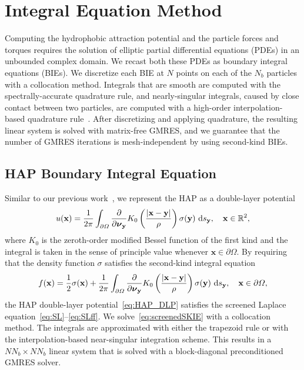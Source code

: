 \documentclass[lineno]{jfm}
\newcommand{\bd}{\partial}
\newcommand{\nnu}{\boldsymbol{\nu}}
\newcommand{\xx}{\mathbf{x}}
\newcommand{\yy}{\mathbf{y}}
\newcommand{\pderiv}[2]{\frac{\partial #1}{\partial #2}}
\begin{document}
\section{Integral Equation Method}
\label{sec:IEM}
Computing the hydrophobic attraction potential and the particle forces
and torques requires the solution of elliptic partial differential
equations (PDEs) in an unbounded complex domain. We recast both these
PDEs as boundary integral equations (BIEs). We discretize each BIE at
$N$ points on each of the $N_b$ particles with a collocation method.
Integrals that are smooth are computed with the spectrally-accurate
quadrature rule, and nearly-singular integrals, caused by close contact
between two particles, are computed with a high-order
interpolation-based quadrature rule~\cite{qua-bir2014}. After
discretizing and applying quadrature, the resulting linear system is
solved with matrix-free GMRES, and we guarantee that the number of GMRES
iterations is mesh-independent by using second-kind BIEs.


\subsection{HAP Boundary Integral Equation}
Similar to our previous work~\cite{Fu20}, we represent the HAP as a
double-layer potential
\begin{align}
  \label{eq:HAP_DLP}
  u(\xx) = \frac{1}{2\pi} \int_{\bd\Omega} \pderiv{}{\nnu_\yy}
    K_0 \left(\frac{|\xx - \yy|}{\rho}\right) \sigma(\yy) \, \dif s_\yy,
    \quad \xx \in \mathbb{R}^2,
\end{align}
where $K_0$ is the zeroth-order modified Bessel function of the first
kind and the integral is taken in the sense of principle value whenever $\xx \in \partial \Omega$. 
By requiring that the density function $\sigma$ satisfies the
second-kind integral equation
\begin{equation}
\label{eq:screenedSKIE}
  f(\xx) = \frac{1}{2}\sigma(\xx) + 
    \frac{1}{2\pi}\int_{\bd\Omega} \pderiv{}{\nnu_\yy}
    K_0 \left(\frac{|\xx - \yy|}{\rho}\right) \sigma(\yy) \, \dif s_\yy,
    \quad \xx \in \bd\Omega,
\end{equation}
the HAP double-layer potential~\eqref{eq:HAP_DLP} satisfies the screened
Laplace equation~\eqref{eq:SL}--\eqref{eq:SLff}. We
solve~\eqref{eq:screenedSKIE} with a collocation method. The integrals
are approximated with either the trapezoid rule or with the
interpolation-based near-singular integration scheme. This results in a
$NN_b \times NN_b$ linear system that is solved with a block-diagonal
preconditioned GMRES solver.
\end{document}

